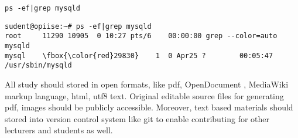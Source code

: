\begin{verbatim}
ps -ef|grep mysqld
\end{verbatim}
\label{code_sample}
%
\small{
\begin{Verbatim}[frame=single,
label=Command output,framesep=2mm,rulecolor=\color{red},commandchars=\\\{\}]
sudent@opiise:~# ps -ef|grep mysqld
root     11290 10905  0 10:27 pts/6    00:00:00 grep --color=auto mysqld
mysql    \fbox{\color{red}29830}    1  0 Apr25 ?        00:05:47 /usr/sbin/mysqld
\end{Verbatim}
%
}

All study should stored in open formats, like pdf, OpenDocument , MediaWiki markup language, html, utf8 text. Original editable source files for generating pdf, images should be publicly accessible. Moreover, text based materials should stored into version control system like \gls{git} to enable contributing for other lecturers and students as well.



